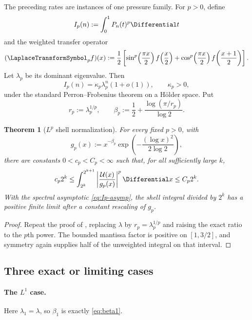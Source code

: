 \documentclass[11pt,oneside]{article}
\newtheorem{theorem}{Theorem}[section]
\theoremstyle{definition}
\theoremstyle{remark}
\newcommand{\Uhat}{\mathcal U}
\begin{document}
The preceding rates are instances of one pressure family.  For $p>0$, define
\begin{equation}\label{eq:Ip}
 I_p(n):=\int_0^1P_n(t)^p\Differential t
\end{equation}
and the weighted transfer operator
\begin{equation}\label{eq:Lp-op}
 (\LaplaceTransformSymbol_p f)(x):=\frac12\left[
 \sin^p\!\left(\frac{\pi x}{2}\right)f\!\left(\frac x2\right)
 +\cos^p\!\left(\frac{\pi x}{2}\right)f\!\left(\frac{x+1}{2}\right)
 \right].
\end{equation}
Let $\lambda_p$ be its dominant eigenvalue.  Then
\begin{equation}\label{eq:Ip-asymp}
 I_p(n)=\kappa_p\lambda_p^n(1+o(1)),
 \qquad \kappa_p>0,
\end{equation}
under the standard Perron--Frobenius theorem on a H\"older space.  Put
\begin{equation}\label{eq:rp-betap}
 r_p:=\lambda_p^{1/p},
 \qquad
 \beta_p:=\frac12+\frac{\log(\pi/r_p)}{\log2}.
\end{equation}

\begin{theorem}[$L^p$ shell normalization]\label{thm:Lp-shell}
For every fixed $p>0$, with
\[
 g_p(x):=x^{-\beta_p}
 \exp\!\left(-\frac{(\log x)^2}{2\log2}\right),
\]
there are constants $0<c_p<C_p<\infty$ such that, for all sufficiently large $k$,
\begin{equation}\label{eq:Lp-shell-bound}
 c_p2^k\le
 \int_{2^k}^{2^{k+1}}
 \left|\frac{\Uhat(x)}{g_p(x)}\right|^p\Differential x
 \le C_p2^k.
\end{equation}
With the spectral asymptotic \eqref{eq:Ip-asymp}, the shell integral divided by $2^k$
has a positive finite limit after a constant rescaling of $g_p$.
\end{theorem}

\begin{proof}
Repeat the proof of , replacing $\lambda$ by
$r_p=\lambda_p^{1/p}$ and raising the exact ratio to the $p$th power.  The bounded
mantissa factor is positive on $[1,3/2]$, and symmetry again supplies half of the
unweighted integral on that interval.
\end{proof}

\subsection{Three exact or limiting cases}

\paragraph{The $L^1$ case.}
Here $\lambda_1=\lambda$, so $\beta_1$ is exactly \eqref{eq:beta1}.
\end{document}
